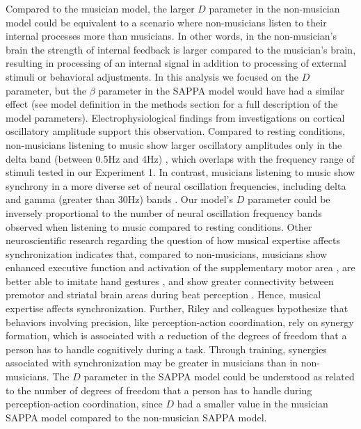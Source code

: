 \documentclass{report}
\begin{document}
Compared to the musician model, the larger $D$ parameter in the non-musician model could be equivalent to a scenario where non-musicians listen to their internal processes more than musicians. In other words, in the non-musician’s brain the strength of internal feedback is larger compared to the musician’s brain, resulting in processing of an internal signal in addition to processing of external stimuli or behavioral adjustments. In this analysis we focused on the $D$ parameter, but the $\beta$ parameter in the SAPPA model would have had a similar effect (see model definition in the methods section for a full description of the model parameters). Electrophysiological findings from investigations on cortical oscillatory amplitude support this observation. Compared to resting conditions, non-musicians listening to music show larger oscillatory amplitudes only in the delta band (between 0.5Hz and 4Hz) \cite{bhattacharya2005phase}, which overlaps with the frequency range of stimuli tested in our Experiment 1. In contrast, musicians listening to music show synchrony in a more diverse set of neural oscillation frequencies, including delta and gamma (greater than 30Hz) bands \cite{bhattacharya2005phase}. Our model's $D$ parameter could be inversely proportional to the number of neural oscillation frequency bands observed when listening to music compared to resting conditions. Other neuroscientific research regarding the question of how musical expertise affects synchronization indicates that, compared to non-musicians, musicians show enhanced executive function and activation of the supplementary motor area \cite{zuk2014behavioral}, are better able to imitate hand gestures \cite{spilka2010gesture}, and show greater connectivity between premotor and striatal brain areas during beat perception \cite{grahn2009feeling}. Hence, musical expertise affects synchronization. Further, Riley and colleagues \cite{riley2012learning} hypothesize that behaviors involving precision, like perception-action coordination, rely on synergy formation, which is associated with a reduction of the degrees of freedom that a person has to handle cognitively during a task. Through training, synergies associated with synchronization may be greater in musicians than in non-musicians. The $D$ parameter in the SAPPA model could be understood as related to the number of degrees of freedom that a person has to handle during perception-action coordination, since $D$ had a smaller value in the musician SAPPA model compared to the non-musician SAPPA model.
\end{document}
